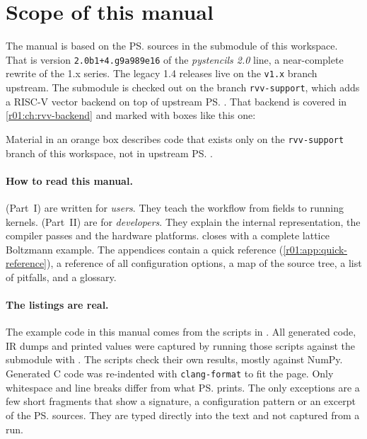 \section{Scope of this manual}

The manual is based on the \ps{} sources in the  submodule
of this workspace. That is version \texttt{2.0b1+4.g9a989e16} of the \emph{pystencils
2.0} line, a near-complete rewrite of the 1.x series. The legacy 1.4 releases live on the
\texttt{v1.x} branch upstream. The submodule is checked out on the branch
\texttt{rvv-support}, which adds a RISC-V vector backend on top of upstream \ps. That
backend is covered in \cref{r01:ch:rvv-backend} and marked with boxes like this one:

\begin{forkonly}
  Material in an orange box describes code that exists only on the \texttt{rvv-support}
  branch of this workspace, not in upstream \ps.
\end{forkonly}

\paragraph{How to read this manual.}
(Part~I) are written for \emph{users}. They teach the workflow from fields to running
kernels. 
(Part~II) are for \emph{developers}. They explain the internal representation, the
compiler passes and the hardware platforms.  closes with a
complete lattice Boltzmann example. The appendices contain a quick reference
(\cref{r01:app:quick-reference}), a reference of all configuration options, a map of the
source tree, a list of pitfalls, and a glossary.

\paragraph{The listings are real.}
The example code in this manual comes from the scripts in
. All generated code, IR dumps and printed values
were captured by running those scripts against the submodule with
. The scripts check their own results, mostly against NumPy.
Generated C code was re-indented with \texttt{clang-format} to fit the page. Only
whitespace and line breaks differ from what \ps{} prints. The only exceptions are a few
short fragments that show a signature, a configuration pattern or an excerpt of the
\ps{} sources. They are typed directly into the text and not captured from a run.
